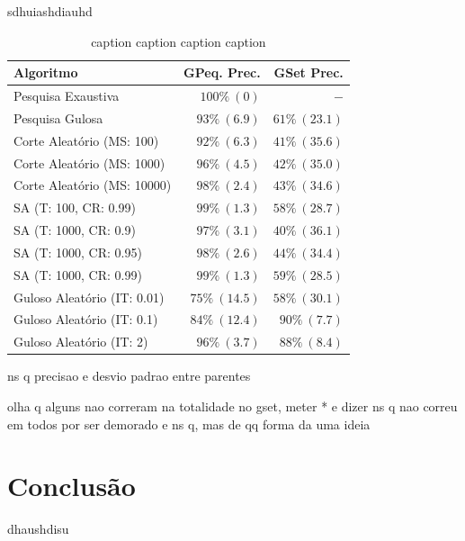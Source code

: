 \documentclass[mirror, portugues]{revdetua}
\begin{document}
sdhuiashdiauhd


\begin{table}[H]
\centering
\caption{caption caption caption caption}
\label{table:precision}
\begin{tabular}{lrr}
\toprule
\textbf{Algoritmo} & \textbf{GPeq. Prec.} & \textbf{GSet Prec.} \\
\midrule
Pesquisa Exaustiva & $100\% \ (0)$ & $-$ \\
Pesquisa Gulosa & $93\% \ (6.9)$ & $61\% \ (23.1)$ \\
Corte Aleatório (MS: 100) & $92\% \ (6.3)$ & $41\% \ (35.6)$ \\
Corte Aleatório (MS: 1000) & $96\% \ (4.5)$ & $42\% \ (35.0)$ \\
Corte Aleatório (MS: 10000) & $98\% \ (2.4)$ & $43\% \ (34.6)$ \\
SA (T: 100, CR: 0.99) & $99\% \ (1.3)$ & $58\% \ (28.7)$ \\
SA (T: 1000, CR: 0.9) & $97\% \ (3.1)$ & $40\% \ (36.1)$ \\
SA (T: 1000, CR: 0.95) & $98\% \ (2.6)$ & $44\% \ (34.4)$ \\
SA (T: 1000, CR: 0.99) & $99\% \ (1.3)$ & $59\% \ (28.5)$ \\
Guloso Aleatório (IT: 0.01) & $75\% \ (14.5)$ & $58\% \ (30.1)$ \\
Guloso Aleatório (IT: 0.1) & $84\% \ (12.4)$ & $90\% \ (7.7)$ \\
Guloso Aleatório (IT: 2) & $96\% \ (3.7)$ & $88\% \ (8.4)$ \\
\bottomrule
\end{tabular}
\end{table}


ns q precisao e desvio padrao entre parentes

olha q alguns nao correram na totalidade no gset, meter * e dizer ns q nao correu em todos por ser demorado e ns q, mas de qq forma da uma ideia

\section{Conclusão}

dhaushdisu




\end{document}

